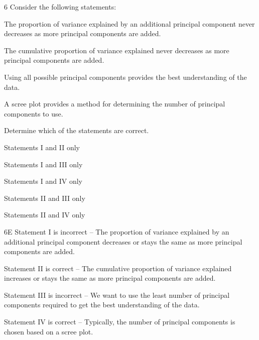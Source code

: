 \begin{question}{6}
Consider the following statements:
\begin{statements}
\item The proportion of variance explained by an additional principal component never decreases as more principal components are added.
\item The cumulative proportion of variance explained never decreases as more principal components are added.
\item Using all possible principal components provides the best understanding of the data.
\item A scree plot provides a method for determining the number of principal components to use.
\end{statements}

Determine which of the statements are correct.

\begin{choices}
\item Statements I and II only
\item Statements I and III only
\item Statements I and IV only
\item Statements II and III only
\item Statements II and IV only
\end{choices}
\end{question}
\begin{solution}{6}{E}
Statement I is incorrect -- The proportion of variance explained by an additional principal component decreases or stays the same as more principal components are added.

Statement II is correct -- The cumulative proportion of variance explained increases or stays the same as more principal components are added.

Statement III is incorrect -- We want to use the least number of principal components required to get the best understanding of the data.

Statement IV is correct -- Typically, the number of principal components is chosen based on a scree plot.
\end{solution}

